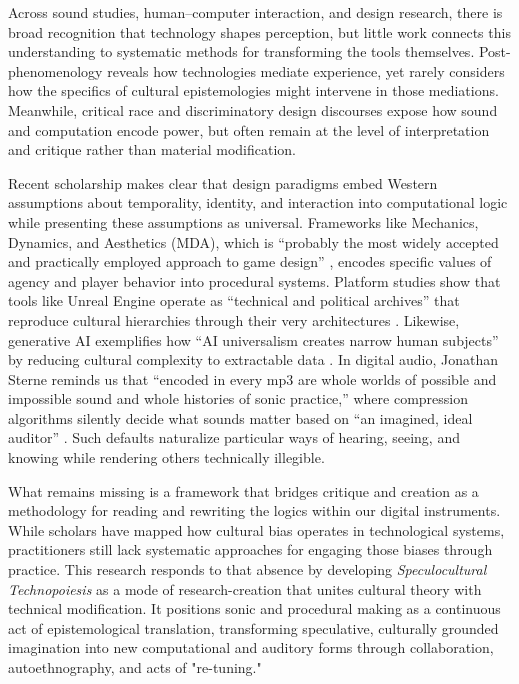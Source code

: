 Across sound studies, human–computer interaction, and design research, there is broad recognition that technology shapes perception, but little work connects this understanding to systematic methods for transforming the tools themselves. Post-phenomenology reveals how technologies mediate experience, yet rarely considers how the specifics of cultural epistemologies might intervene in those mediations. Meanwhile, critical race and discriminatory design discourses expose how sound and computation encode power, but often remain at the level of interpretation and critique rather than material modification.

Recent scholarship makes clear that design paradigms embed Western assumptions about temporality, identity, and interaction into computational logic while presenting these assumptions as universal. Frameworks like Mechanics, Dynamics, and Aesthetics (MDA), which is “probably the most widely accepted and practically employed approach to game design” \parencite{Walk_2017}, encodes specific values of agency and player behavior into procedural systems. Platform studies show that tools like Unreal Engine operate as “technical and political archives” that reproduce cultural hierarchies through their very architectures \parencite{Malazita_2024}. Likewise, generative AI exemplifies how “AI universalism creates narrow human subjects” by reducing cultural complexity to extractable data \parencite{Klein_2025}. In digital audio, Jonathan Sterne reminds us that “encoded in every mp3 are whole worlds of possible and impossible sound and whole histories of sonic practice,” where compression algorithms silently decide what sounds matter based on “an imagined, ideal auditor” \parencite[p.2]{Sterne_2012}. Such defaults naturalize particular ways of hearing, seeing, and knowing while rendering others technically illegible.

What remains missing is a framework that bridges critique and creation as a methodology for reading and rewriting the logics within our digital instruments. While scholars have mapped how cultural bias operates in technological systems, practitioners still lack systematic approaches for engaging those biases through practice. This research responds to that absence by developing \emph{Speculocultural Technopoiesis} as a mode of research-creation that unites cultural theory with technical modification. It positions sonic and procedural making as a continuous act of epistemological translation, transforming speculative, culturally grounded imagination into new computational and auditory forms through collaboration, autoethnography, and acts of "re-tuning."
